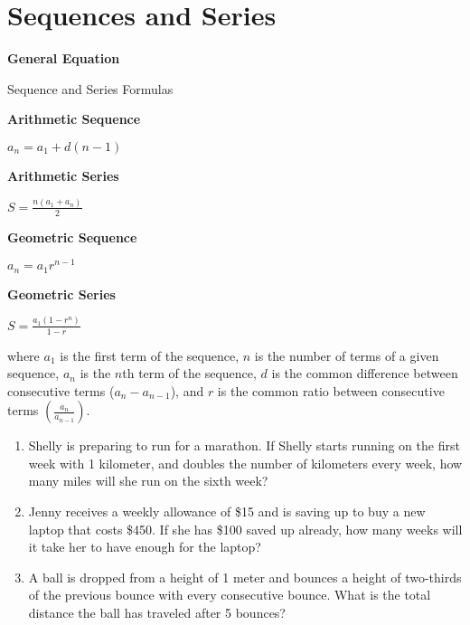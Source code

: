 \section{Sequences and Series}

\bigskip
\textbf{General Equation}

\bigskip
\begin{equationbox}{Sequence and Series Formulas}
\setlength{\columnseprule}{0pt}
\begin{center}
\begin{multicols}{2}

\textbf{Arithmetic Sequence}


$a_n=a_1+d(n-1)$

\vspace{2em}
\textbf{Arithmetic Series}

\medskip
$S=\frac{n(a_1+a_n)}{2}$

\columnbreak
\textbf{Geometric Sequence}

\smallskip
$a_n=a_1r^{n-1}$

\vspace{2em}
\textbf{Geometric Series}

\medskip
$S=\frac{a_1(1-r^n)}{1-r}$
\end{multicols}
\end{center}

where $a_1$ is the first term of the sequence, $n$ is the number of terms of a given sequence, $a_n$ is the $n$th term of the sequence, $d$ is the common difference between consecutive terms ($a_n-a_{n-1}$), and $r$ is the common ratio between consecutive terms $\left(\frac{a_n}{a_{n-1}}\right)$.
\end{equationbox}

\vspace{1em}
\begin{enumerate}[labelindent=*,style=multiline,leftmargin=*,label=\textbf{Example \arabic*:}]
\item Shelly is preparing to run for a marathon. If Shelly starts running on the first week with 1 kilometer, and doubles the number of kilometers every week, how many miles will she run on the sixth week?

\vfill\item Jenny receives a weekly allowance of \$15 and is saving up to buy a new laptop that costs \$450. If she has \$100 saved up already, how many weeks will it take her to have enough for the laptop?

\vfill\item A ball is dropped from a height of 1 meter and bounces a height of two-thirds of the previous bounce with every consecutive bounce. What is the total distance the ball has traveled after 5 bounces?
\end{enumerate}

